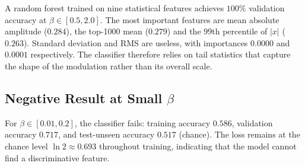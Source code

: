 A random forest trained on nine statistical features achieves $100\%$
validation accuracy at $\beta \in [0.5, 2.0]$. The most important
features are mean absolute amplitude ($0.284$), the top-1000 mean
($0.279$) and the $99$th percentile of $|x|$ ($0.263$). Standard
deviation and RMS are useless, with importances $0.0000$ and $0.0001$
respectively. The classifier therefore relies on tail statistics that
capture the shape of the modulation rather than its overall scale.

\subsection{Negative Result at Small $\beta$}

For $\beta \in [0.01, 0.2]$, the classifier fails: training accuracy
$0.586$, validation accuracy $0.717$, and test-unseen accuracy $0.517$
(chance). The loss remains at the chance level $\ln 2 \approx 0.693$
throughout training, indicating that the model cannot find a
discriminative feature.
